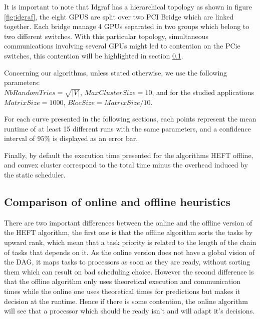 \documentclass[10pt, conference, compsocconf,pdftex,dvipsnames]{IEEEtran}
\begin{document}
It is important to note that Idgraf has a hierarchical topology as shown in
figure \ref{fig:idgraf}, the eight GPUS are split over two PCI Bridge which
are linked together. Each bridge manage 4 GPUs separated in two groups which
belong to two different switches. With this particular topology, simultaneous
communications involving several GPUs might led to contention on the PCie switches,
this contention will be highlighted in section \ref{sec:exp-exp-perf}.

Concerning our algorithms, unless stated otherwise, we use the following
parameters:\\
$NbRandomTries=\sqrt{|V|}$, $MaxClusterSize=10$, and for the
studied applications\\
$MatrixSize=1000$, $BlocSize=MatrixSize/10$.

For each curve presented in the following sections, each points represent the
mean runtime of at least 15 different runs with the same parameters, and a
confidence interval of $95\%$ is displayed as an error bar.

Finally, by default the execution time presented for the algorithms HEFT
offline, and convex cluster correspond to the total time minus the overhead
induced by the static scheduler.


\subsection{Comparison of online and offline heuristics}
\label{sec:exp-exp-perf}

There are two important differences between the online and the offline version
of the HEFT algorithm, the first one is that the offline algorithm sorts the tasks
by upward rank, which mean that a task priority is related to the length of
the chain of tasks that depends on it. As the online version does not have a
global vision of the DAG, it maps tasks to processors as soon as they are
ready, without sorting them which can result on bad scheduling choice. However
the second difference is that the offline algorithm only uses theoretical
execution and communication times while the online one uses theoretical times
for predictions but makes it decision at the runtime. Hence if there is some
contention, the online algorithm will see that a processor which should be
ready isn't and will adapt it's decisions.
\end{document}
